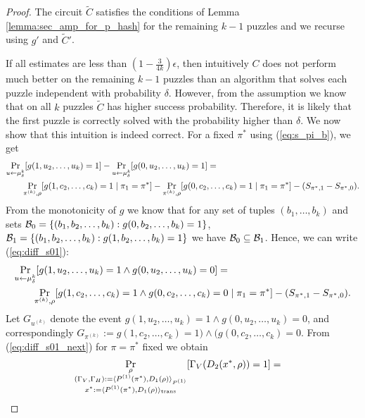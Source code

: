 \begin{proof}
The circuit $\widetilde{C}$ satisfies the conditions of Lemma \ref{lemma:sec_amp_for_p_hash} for
the remaining $k-1$ puzzles and we recurse using $g'$ and $\widetilde{C}'$.

If all estimates are less than $(1-\frac{3}{4k})\epsilon$, then intuitively $C$
does not perform much better on the remaining $k-1$ puzzles than an algorithm that solves each puzzle independent with probability $\delta$.
However, from the assumption we know that on all $k$ puzzles $\widetilde{C}$ has higher success probability.
Therefore, it is likely that the first puzzle is correctly solved with the probability higher than $\delta$.
%
We now show that this intuition is indeed correct. For a fixed $\pi^*$ using (\ref{eq:s_pi_b}), we get
\begin{align}
\label{eq:diff_s01}
  &\underset{u \leftarrow \mu_{\delta}^k}{\Pr}[g(1, u_2, \dots, u_k)=1] - \underset{u \leftarrow \mu_{\delta}^k}{\Pr}[g(0, u_2, \dots, u_k)=1] = \notag\\
&\mbox\qquad  \underset{\pi^{(k)}, \rho}{\Pr}[g(1, c_2, \dots, c_k) =1 \mid \pi_1 = \pi^*] - \underset{\pi^{(k)}, \rho}{\Pr}[g(0, c_2, \dots, c_k) = 1 \mid \pi_1 = \pi^*] - (S_{\pi^*,1} - S_{\pi^*,0}).
\end{align}
From the monotonicity of $g$ we know that for any set of tuples $(b_1, \dots, b_k)$
and sets $\mathcal{B}_0 = \{ (b_1, b_2, \dots, b_k): g(0, b_2, \dots, b_k) = 1\}$, $ \mathcal{B}_1 = \{(b_1, b_2, \dots, b_k) : g(1, b_2, \dots, b_k) = 1 \}$
we have $\mathcal{B}_0 \subseteq \mathcal{B}_1$. Hence, we can write (\ref{eq:diff_s01}):
\begin{align}
  \label{eq:diff_s01_next}
  &\underset{u \leftarrow \mu_{\delta}^k}{\Pr}[g(1, u_2, \dots, u_k) = 1 \land g(0, u_2, \dots, u_k) = 0] = \notag\\
&\mbox\qquad  \underset{\pi^{(k)}, \rho}{\Pr}[g(1, c_2, \dots, c_k) = 1 \land g(0, c_2, \dots, c_k) = 0 \mid \pi_1 = \pi^*] - (S_{\pi^*,1} - S_{\pi^*,0}).
\end{align}
Let $G_{u^{(k)}}$ denote the event $g(1, u_2, \dots, u_k) = 1 \land g(0, u_2, \dots, u_k) = 0$, and correspondingly
$G_{\pi^{(k)}} := g(1, c_2, \dots, c_k) = 1) \land (g(0, c_2, \dots, c_k) = 0$.
From (\ref{eq:diff_s01_next}) for $\pi = \pi^*$ fixed we obtain
\begin{align}
\label{eq:pr_d_succ_0}
  \underset{\substack{\rho \\ \prGx}}{\Pr}[\Gamma_V(D_2(x^*, \rho)) = 1] &=

\end{align}
\end{proof}
